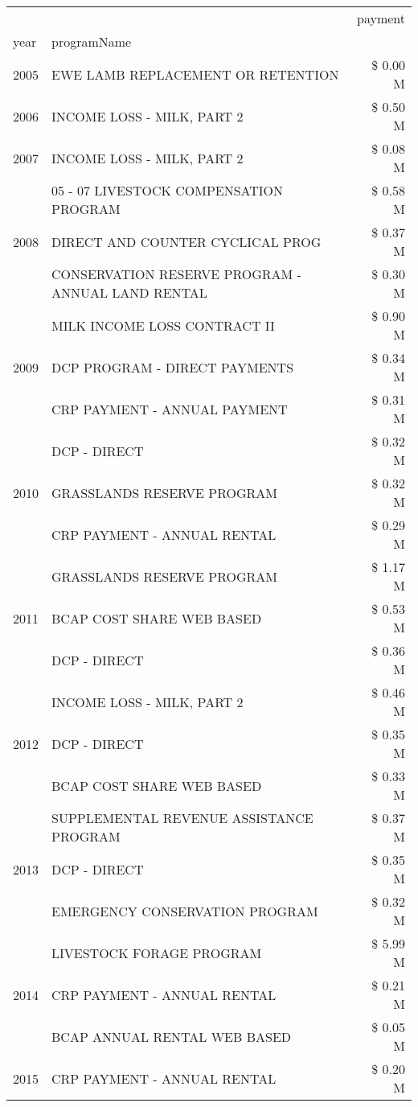 \begin{tabular}{llr}
\toprule
 &  & payment \\
year & programName &  \\
\midrule
2005 & EWE LAMB REPLACEMENT OR RETENTION & \$ 0.00 M \\
\cline{1-3}
2006 & INCOME LOSS - MILK, PART 2 & \$ 0.50 M \\
\cline{1-3}
2007 & INCOME LOSS - MILK, PART 2 & \$ 0.08 M \\
\cline{1-3}
\multirow[t]{3}{*}{2008} & 05 - 07 LIVESTOCK COMPENSATION PROGRAM & \$ 0.58 M \\
 & DIRECT AND COUNTER CYCLICAL PROG & \$ 0.37 M \\
 & CONSERVATION RESERVE PROGRAM - ANNUAL LAND RENTAL & \$ 0.30 M \\
\cline{1-3}
\multirow[t]{3}{*}{2009} & MILK INCOME LOSS CONTRACT II & \$ 0.90 M \\
 & DCP PROGRAM - DIRECT PAYMENTS & \$ 0.34 M \\
 & CRP PAYMENT - ANNUAL PAYMENT & \$ 0.31 M \\
\cline{1-3}
\multirow[t]{3}{*}{2010} & DCP - DIRECT & \$ 0.32 M \\
 & GRASSLANDS RESERVE PROGRAM & \$ 0.32 M \\
 & CRP PAYMENT - ANNUAL RENTAL & \$ 0.29 M \\
\cline{1-3}
\multirow[t]{3}{*}{2011} & GRASSLANDS RESERVE PROGRAM & \$ 1.17 M \\
 & BCAP COST SHARE WEB BASED & \$ 0.53 M \\
 & DCP - DIRECT & \$ 0.36 M \\
\cline{1-3}
\multirow[t]{3}{*}{2012} & INCOME LOSS - MILK, PART 2 & \$ 0.46 M \\
 & DCP - DIRECT & \$ 0.35 M \\
 & BCAP COST SHARE WEB BASED & \$ 0.33 M \\
\cline{1-3}
\multirow[t]{3}{*}{2013} & SUPPLEMENTAL REVENUE ASSISTANCE PROGRAM & \$ 0.37 M \\
 & DCP - DIRECT & \$ 0.35 M \\
 & EMERGENCY CONSERVATION PROGRAM & \$ 0.32 M \\
\cline{1-3}
\multirow[t]{3}{*}{2014} & LIVESTOCK FORAGE PROGRAM & \$ 5.99 M \\
 & CRP PAYMENT - ANNUAL RENTAL & \$ 0.21 M \\
 & BCAP ANNUAL RENTAL WEB BASED & \$ 0.05 M \\
\cline{1-3}
\multirow[t]{3}{*}{2015} & CRP PAYMENT - ANNUAL RENTAL & \$ 0.20 M \\

\end{tabular}
